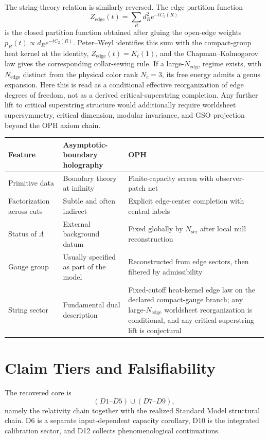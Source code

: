 \documentclass[11pt]{article}
\begin{document}
The string-theory relation is similarly reversed. The edge partition function
\[
Z_{\mathrm{edge}}(t)=\sum_R d_R^2 e^{-t C_2(R)}
\]
is the closed partition function obtained after gluing the open-edge weights $p_R(t)\propto d_R e^{-tC_2(R)}$. Peter--Weyl identifies this sum with the compact-group heat kernel at the identity, \(Z_{\mathrm{edge}}(t)=K_t(1)\), and the Chapman--Kolmogorov law gives the corresponding collar-sewing rule. If a large-$N_{\mathrm{edge}}$ regime exists, with $N_{\mathrm{edge}}$ distinct from the physical color rank $N_c=3$, its free energy admits a genus expansion. Here this is read as a conditional effective reorganization of edge degrees of freedom, not as a derived critical-superstring completion. Any further lift to critical superstring structure would additionally require worldsheet supersymmetry, critical dimension, modular invariance, and GSO projection beyond the OPH axiom chain.

\begingroup
\footnotesize
\begin{tabular}{@{}>{\raggedright\arraybackslash}p{}>{\raggedright\arraybackslash}p{}>{\raggedright\arraybackslash}p{}@{}}
\toprule
Feature & Asymptotic-boundary holography & OPH \\
\midrule
Primitive data & Boundary theory at infinity & Finite-capacity screen with observer-patch net \\
Factorization across cuts & Subtle and often indirect & Explicit edge-center completion with central labels \\
Status of $\Lambda$ & External background datum & Fixed globally by $N_{\mathrm{scr}}$ after local null reconstruction \\
Gauge group & Usually specified as part of the model & Reconstructed from edge sectors, then filtered by admissibility \\
String sector & Fundamental dual description & Fixed-cutoff heat-kernel edge law on the declared compact-gauge branch; any large-$N_{\mathrm{edge}}$ worldsheet reorganization is conditional, and any critical-superstring lift is conjectural \\
\bottomrule
\end{tabular}
\endgroup

\section{Claim Tiers and Falsifiability}

The recovered core is
\[
(D1\text{--}D5)\cup(D7\text{--}D9),
\]
namely the relativity chain together with the realized Standard Model structural chain. D6 is a separate input-dependent capacity corollary, D10 is the integrated calibration sector, and D12 collects phenomenological continuations.
\end{document}

